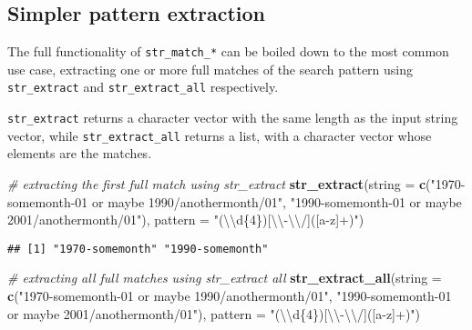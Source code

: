 \documentclass[
]{book}
\newenvironment{Shaded}{}{}
\newcommand{\CharTok}[1]{\textcolor[rgb]{0.25,0.44,0.63}{#1}}
\newcommand{\CommentTok}[1]{\textcolor[rgb]{0.38,0.63,0.69}{\textit{#1}}}
\newcommand{\DataTypeTok}[1]{\textcolor[rgb]{0.56,0.13,0.00}{#1}}
\newcommand{\KeywordTok}[1]{\textcolor[rgb]{0.00,0.44,0.13}{\textbf{#1}}}
\newcommand{\NormalTok}[1]{#1}
\newcommand{\StringTok}[1]{\textcolor[rgb]{0.25,0.44,0.63}{#1}}
\begin{document}
\hypertarget{simpler-pattern-extraction}{%
\subsection{Simpler pattern extraction}\label{simpler-pattern-extraction}}

The full functionality of \texttt{str\_match\_*} can be boiled down to the most common use case, extracting one or more full matches of the search pattern using \texttt{str\_extract} and \texttt{str\_extract\_all} respectively.

\texttt{str\_extract} returns a character vector with the same length as the input string vector, while \texttt{str\_extract\_all} returns a list, with a character vector whose elements are the matches.

\begin{Shaded}
\begin{Highlighting}[]
\CommentTok{# extracting the first full match using str_extract}
\KeywordTok{str_extract}\NormalTok{(}\DataTypeTok{string =} \KeywordTok{c}\NormalTok{(}\StringTok{"1970-somemonth-01 or maybe 1990/anothermonth/01"}\NormalTok{,}
                       \StringTok{"1990-somemonth-01 or maybe 2001/anothermonth/01"}\NormalTok{),}
            \DataTypeTok{pattern =} \StringTok{"(}\CharTok{\textbackslash{}\textbackslash{}}\StringTok{d\{4\})[}\CharTok{\textbackslash{}\textbackslash{}}\StringTok{-}\CharTok{\textbackslash{}\textbackslash{}}\StringTok{/]([a-z]+)"}\NormalTok{)}
\end{Highlighting}
\end{Shaded}

\begin{verbatim}
## [1] "1970-somemonth" "1990-somemonth"
\end{verbatim}

\begin{Shaded}
\begin{Highlighting}[]
\CommentTok{# extracting all full matches using str_extract all}
\KeywordTok{str_extract_all}\NormalTok{(}\DataTypeTok{string =} \KeywordTok{c}\NormalTok{(}\StringTok{"1970-somemonth-01 or maybe 1990/anothermonth/01"}\NormalTok{,}
                           \StringTok{"1990-somemonth-01 or maybe 2001/anothermonth/01"}\NormalTok{),}
                \DataTypeTok{pattern =} \StringTok{"(}\CharTok{\textbackslash{}\textbackslash{}}\StringTok{d\{4\})[}\CharTok{\textbackslash{}\textbackslash{}}\StringTok{-}\CharTok{\textbackslash{}\textbackslash{}}\StringTok{/]([a-z]+)"}\NormalTok{)}
\end{Highlighting}
\end{Shaded}
\end{document}
